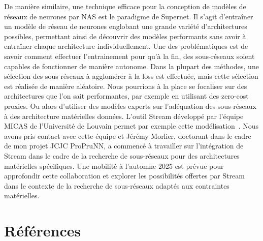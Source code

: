 \documentclass[11pt]{report}
\begin{document}
De manière similaire, une technique efficace pour la conception de modèles de réseaux de neurones par NAS est le paradigme de Supernet. Il s'agit d'entraîner un modèle de réseau de neurones englobant une grande variété d'architectures possibles, permettant ainsi de découvrir des modèles performants sans avoir à entraîner chaque architecture individuellement. Une des problématiques est de savoir comment effectuer l'entrainement pour qu'à la fin, des sous-réseaux soient capables de fonctionner de manière autonome. Dans la plupart des méthodes, une sélection des sous réseaux à agglomérer à la loss est effectuée, mais cette sélection est réalisée de manière aléatoire. Nous pourrions à la place se focaliser sur des architectures que l'on sait performantes, par exemple en utilisant des zero-cost proxies. Ou alors d'utiliser des modèles experts sur l'adéquation des sous-réseaux à des architecture matérielles données. L'outil Stream développé par l'équipe MICAS de l'Université de Louvain permet par exemple cette modélisation~\cite{symons2022}. Nous avons pris contact avec cette équipe et Jérémy Morlier, doctorant dans le cadre de mon projet JCJC ProPruNN, a commencé à travailler sur l'intégration de Stream dans le cadre de la recherche de sous-réseaux pour des architectures matérielles spécifiques. Une mobilité à l'automne 2025 est prévue pour approfondir cette collaboration et explorer les possibilités offertes par Stream dans le contexte de la recherche de sous-réseaux adaptés aux contraintes matérielles.

\section{Références}
\printbibliography[keyword={REFERENCE}, heading=none]
\end{document}

